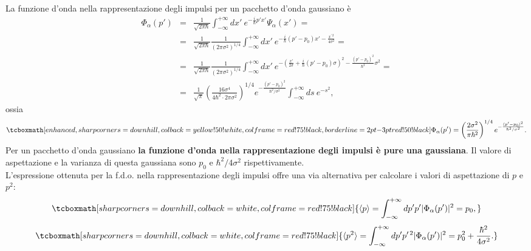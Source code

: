 La funzione d'onda nella rappresentazione degli impulsi per un pacchetto d'onda gaussiano è
	\begin{eqnarray}
		\Phi_\alpha(p') &=& \frac{1}{\sqrt{2 \pi \hbar}} \int_{-\infty}^{+\infty} dx'~ e^{-\frac{i}{\hbar} p' x'} \Psi_\alpha(x') = \nonumber \\
		&=& \frac{1}{\sqrt{2 \pi \hbar}} \frac{1}{(2 \pi \sigma^2)^{1/4}} \int_{-\infty}^{+\infty} dx'~ e^{-\frac{i}{\hbar} (p'-p_0) x' - \frac{x^{\prime \, 2}}{4 \sigma^2}} = \nonumber \\
		&=& \frac{1}{\sqrt{2 \pi \hbar}} \frac{1}{(2 \pi \sigma^2)^{1/4}} \int_{-\infty}^{+\infty} dx'~ e^{-\left(\frac{x'}{2 \sigma} + \frac{i}{\hbar} (p'-p_0) \sigma \right)^2 - \frac{(p'-p_0)^2}{\hbar^2}\sigma^2} = \nonumber \\
		&=&  \frac{1}{\sqrt{\pi}} \left(\frac{16 \sigma^4}{4 \hbar^2 \cdot 2 \pi \sigma^2} \right)^{1/4} e^{-\frac{(p'-p_0)^2}{\hbar^2/\sigma^2}} \int_{-\infty}^{+\infty} ds ~e^{-s^2},
	\end{eqnarray}
ossia
	\begin{equation}
		\tcboxmath[enhanced,sharp corners=downhill ,colback=yellow!50!white,colframe=red!75!black, borderline={2pt}{-3pt}{red!50!black}]{
			\Phi_\alpha(p') = \left(\frac{2 \sigma^2}{\pi \hbar^2} \right)^{1/4} e^{-\frac{(p'-p_0)^2}{\hbar^2/\sigma^2}}.
			}
	\end{equation}
Per un pacchetto d'onda gaussiano \textbf{la funzione d'onda nella rappresentazione degli impulsi è pure una gaussiana}. Il valore di aspettazione e la varianza di questa gaussiana sono $p_0$ e $\hbar^2/4 \sigma^2$ rispettivamente.\\

L'espressione ottenuta per la f.d.o. nella rappresentazione degli impulsi offre una via alternativa per calcolare i valori di aspettazione di $p$ e $p^2$:
	\begin{equation}
		\tcboxmath[sharp corners=downhill ,colback=white,colframe=red!75!black]{
		\langle p \rangle = \int_{-\infty}^{+\infty} dp' p' |\Phi_\alpha(p')|^2 = p_0,
			}
	\end{equation}
	\begin{equation}
		\tcboxmath[sharp corners=downhill ,colback=white,colframe=red!75!black]{
		\langle p^2 \rangle = \int_{-\infty}^{+\infty} dp' p^{\prime \, 2} |\Phi_\alpha(p')|^2 = p_0^2 + \frac{\hbar^2}{4 \sigma^2}.
			}
	\end{equation}
